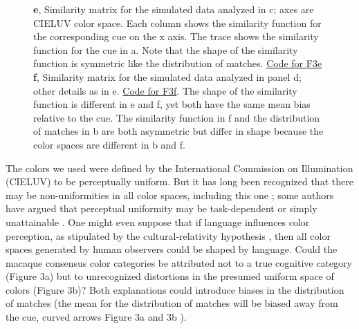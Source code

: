 \begin{figure}
\begin{fullwidth}
{    \textbf{e}, Similarity matrix for the simulated data analyzed in c; axes are CIELUV color space. Each column shows the similarity function for the corresponding cue on the x axis. The trace shows the similarity function for the cue in a. Note that the shape of the similarity function is symmetric like the distribution of matches. \href{https://github.com/NEI-LSR/MacaqueColorCategories/blob/main/Outputs/Paper/Figures/working/F3_TCCModel/Code/F3ace_TCCModel_OffsetGaussian.m}{Code for F3e} \textbf{f}, Similarity matrix for the simulated data analyzed in panel d; other details as in e. \href{https://github.com/NEI-LSR/MacaqueColorCategories/blob/main/Outputs/Paper/Figures/working/F3_TCCModel/Code/F3bdf_TCCModel_StimulusSpaceNonUnifomity.m}{Code for F3f}. The shape of the similarity function is different in e and f, yet both have the same mean bias relative to the cue. The similarity function in f and the distribution of matches in b are both asymmetric but differ in shape because the color spaces are different in b and f.}
    \label{fig:TCCDemo}
    \end{fullwidth}
\end{figure}

The colors we used were defined by the International Commission on Illumination (CIELUV) to be perceptually uniform. 
But it has long been recognized that there may be non-uniformities in all color spaces, including this one \citep{stockman_colorimetry_2010}; some authors have argued that perceptual uniformity may be task-dependent or simply unattainable \citep{judd_ideal_1969}. One might even suppose that if language influences color perception, as stipulated by the cultural-relativity hypothesis \citep{roberson_color_2005}, then all color spaces generated by human observers could be shaped by language. Could the macaque consensus color categories be attributed not to a true cognitive category (Figure 3a) but to unrecognized distortions in the presumed uniform space of colors (Figure 3b)? Both explanations could introduce biases in the distribution of matches (the mean for the distribution of matches will be biased away from the cue, curved arrows Figure 3a and 3b ).

